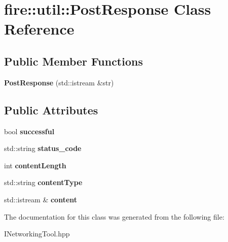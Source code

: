 \hypertarget{a01972}{}\section{fire\+:\+:util\+:\+:Post\+Response Class Reference}
\label{a01972}
\subsection*{Public Member Functions}
\begin{DoxyCompactItemize}
\item 
\mbox{\label{a01972_a5c4a9dde75ca0b36f3ac5a952191b499}} 
{\bfseries Post\+Response} (std\+::istream \&str)
\end{DoxyCompactItemize}
\subsection*{Public Attributes}
\begin{DoxyCompactItemize}
\item 
\mbox{\label{a01972_a573489b03400d9b404fa6213e200fc18}} 
bool {\bfseries successful}
\item 
\mbox{\label{a01972_af910a38fd726bf091c2259cee828f323}} 
std\+::string {\bfseries status\+\_\+code}
\item 
\mbox{\label{a01972_a7af747fe1bf9ea8f93142fd9b930f70f}} 
int {\bfseries content\+Length}
\item 
\mbox{\label{a01972_a155fa2cfc521cb80c2c8eeb8ef146b4d}} 
std\+::string {\bfseries content\+Type}
\item 
\mbox{\label{a01972_aa97f3fbefa67e2503cf18276f57d4b8e}} 
std\+::istream \& {\bfseries content}
\end{DoxyCompactItemize}


The documentation for this class was generated from the following file\+:\begin{DoxyCompactItemize}
\item 
I\+Networking\+Tool.\+hpp\end{DoxyCompactItemize}
